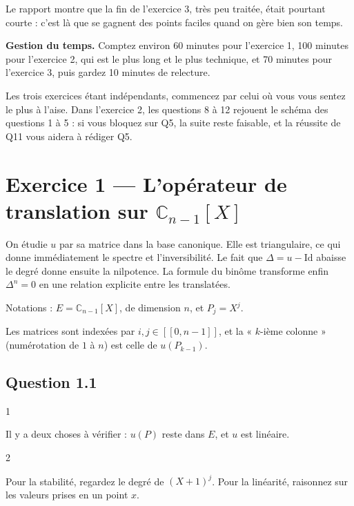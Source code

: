 \documentclass[11pt,a4paper]{article}
\begin{document}
Le rapport montre que la fin de l'exercice 3, très peu traitée, était pourtant courte : c'est là que se gagnent des points faciles quand on gère bien son temps.

\textbf{Gestion du temps.} Comptez environ 60 minutes pour l'exercice 1, 100 minutes pour l'exercice 2, qui est le plus long et le plus technique, et 70 minutes pour l'exercice 3, puis gardez 10 minutes de relecture.

Les trois exercices étant indépendants, commencez par celui où vous vous sentez le plus à l'aise. Dans l'exercice 2, les questions 8 à 12 rejouent le schéma des questions 1 à 5 : si vous bloquez sur Q5, la suite reste faisable, et la réussite de Q11 vous aidera à rédiger Q5.

\hypertarget{exercice-1-lopuxe9rateur-de-translation-sur-mathbb-c_n-1x}{%
\section{\texorpdfstring{Exercice 1 --- L'opérateur de translation sur \(\mathbb C_{n-1}[X]\)}{Exercice 1 --- L'opérateur de translation sur \textbackslash mathbb C\_\{n-1\}{[}X{]}}}\label{exercice-1-lopuxe9rateur-de-translation-sur-mathbb-c_n-1x}}

On étudie \(u\) par sa matrice dans la base canonique. Elle est triangulaire, ce qui donne immédiatement le spectre et l'inversibilité. Le fait que \(\Delta=u-\mathrm{Id}\) abaisse le degré donne ensuite la nilpotence. La formule du binôme transforme enfin \(\Delta^n=0\) en une relation explicite entre les translatées.

Notations : \(E=\mathbb C_{n-1}[X]\), de dimension \(n\), et \(P_j=X^j\).

Les matrices sont indexées par \(i,j\in[\![0,n-1]\!]\), et la « \(k\)-ième colonne » (numérotation de \(1\) à \(n\)) est celle de \(u(P_{k-1})\).

\hypertarget{question-1.1}{%
\subsection{Question 1.1}\label{question-1.1}}

\begin{indication}{1}

Il y a deux choses à vérifier : \(u(P)\) reste dans \(E\), et \(u\) est linéaire.

\end{indication}

\begin{indication}{2}

Pour la stabilité, regardez le degré de \((X+1)^j\). Pour la linéarité, raisonnez sur les valeurs prises en un point \(x\).

\end{indication}
\end{document}
